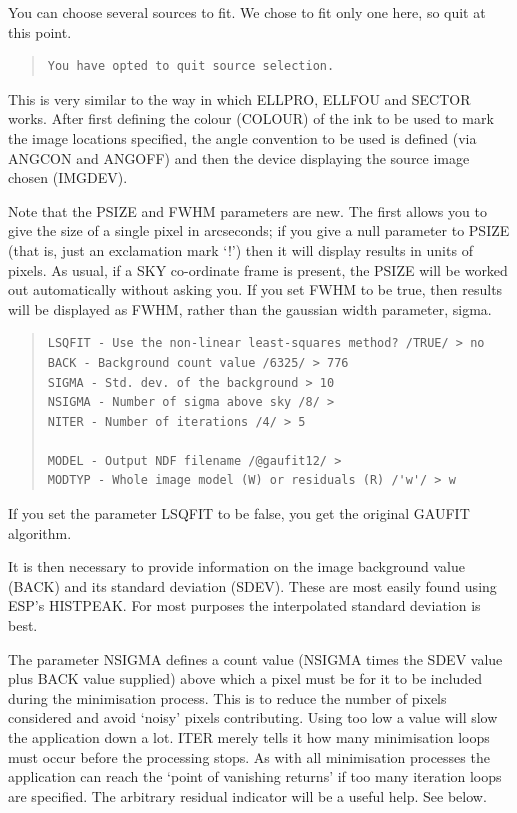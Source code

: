\documentclass[twoside,11pt]{article}
\newenvironment{myquote}{\begin{quote}\begin{small}}{\end{small}\end{quote}}
\begin{document}
You can choose several sources to fit.  We chose to fit only one here,
so quit at this point.

\begin{myquote}
\begin{verbatim}
You have opted to quit source selection.
\end{verbatim}
\end{myquote}

This is very similar to the way in which ELLPRO, ELLFOU and SECTOR works. 
After first defining the colour (COLOUR) of the ink to be used to mark the 
image locations specified, the angle convention to be used is 
defined (via ANGCON and ANGOFF) and then the device displaying the 
source image chosen (IMGDEV).

Note that the PSIZE and FWHM parameters are new.  The first allows
you to give the size of a single pixel in arcseconds; if you give a
null parameter to PSIZE (that is, just an exclamation mark `!') then
it will display results in units of pixels.  As usual, if a SKY
co-ordinate frame is present, the PSIZE will be worked out automatically
without asking you.
If you set FWHM to be
true, then results will be displayed as FWHM, rather than the gaussian
width parameter, sigma.

\begin{myquote}
\begin{verbatim}
LSQFIT - Use the non-linear least-squares method? /TRUE/ > no
BACK - Background count value /6325/ > 776
SIGMA - Std. dev. of the background > 10
NSIGMA - Number of sigma above sky /8/ >             
NITER - Number of iterations /4/ > 5
  
MODEL - Output NDF filename /@gaufit12/ > 
MODTYP - Whole image model (W) or residuals (R) /'w'/ > w
\end{verbatim}
\end{myquote}

If you set the parameter LSQFIT to be false, you get the original
GAUFIT algorithm.

It is then necessary to provide information on the image background value
(BACK) and its standard deviation (SDEV). These are most easily found 
using ESP's HISTPEAK. For most purposes the interpolated standard deviation is
best.

The parameter NSIGMA defines a count value (NSIGMA times the SDEV value 
plus BACK value supplied)
above which a pixel must be
for it to be included during the minimisation process. This is to reduce
the number of pixels considered and avoid `noisy' pixels contributing. 
Using too low a value will slow the application down a lot. 
ITER merely tells it how many minimisation loops must occur before the 
processing stops. As with all minimisation processes the application can 
reach the `point of vanishing returns' if too many iteration loops are 
specified. The arbitrary residual indicator will be a useful help. See below.
\end{document}
